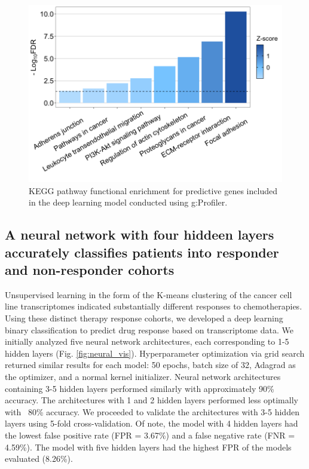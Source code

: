 \documentclass[10pt, letterpaper]{article}
\begin{document}
\begin{multicols}{2}
\begin{figure}[!ht]
	\centering
	\includegraphics[width=\textwidth]{Figures/kegg.png}
	\caption{KEGG pathway functional enrichment for predictive genes included in the deep learning model conducted using g:Profiler.}
	\label{fig:kegg}
\end{figure}


\subsection*{A neural network with four hiddeen layers accurately classifies patients into responder and non-responder cohorts}
Unsupervised learning in the form of the K-means clustering of the cancer cell line transcriptomes indicated substantially different responses to chemotherapies. Using these distinct therapy response cohorts, we developed a deep learning binary classification to predict drug response based on transcriptome data. We initially analyzed five neural network architectures, each corresponding to 1-5 hidden layers (Fig. \ref{fig:neural_vis}). Hyperparameter optimization via grid search returned similar results for each model: 50 epochs, batch size of 32, Adagrad as the optimizer, and a normal kernel initializer. Neural network architectures containing 3-5 hidden layers performed similarly with approximately 90\% accuracy. The architectures with 1 and 2 hidden layers performed less optimally with ~80\% accuracy. We proceeded to validate the architectures with 3-5 hidden layers using 5-fold cross-validation. Of note, the model with 4 hidden layers had the lowest false positive rate (FPR = 3.67\%) and a false negative rate (FNR = 4.59\%). The model with five hidden layers had the highest FPR of the models evaluated (8.26\%).


\end{multicols}
\end{document}

